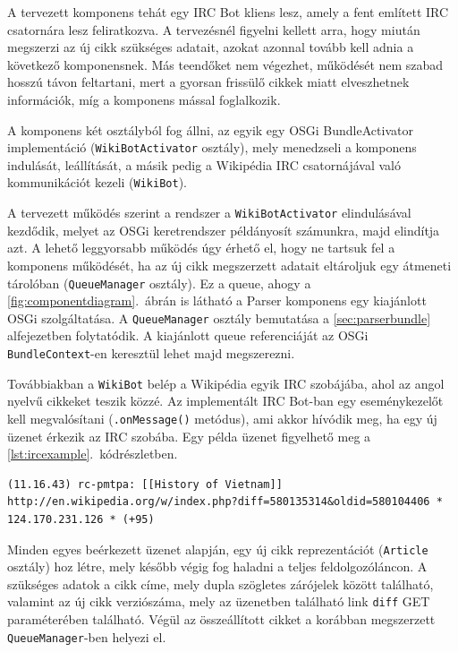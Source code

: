 A tervezett komponens tehát egy IRC Bot kliens lesz, amely a fent említett IRC csatornára lesz feliratkozva. A tervezésnél figyelni kellett arra, hogy miután megszerzi az új cikk szükséges adatait, azokat azonnal tovább kell adnia a következő komponensnek. Más teendőket nem végezhet, működését nem szabad hosszú távon feltartani, mert a gyorsan frissülő cikkek miatt elveszhetnek információk, míg a komponens mással foglalkozik.

A komponens két osztályból fog állni, az egyik egy OSGi BundleActivator implementáció (\texttt{WikiBotActivator} osztály), mely menedzseli a komponens indulását, leállítását, a másik pedig a Wikipédia IRC csatornájával való kommunikációt kezeli (\texttt{WikiBot}).

A tervezett működés szerint a rendszer a \texttt{WikiBotActivator} elindulásával kezdődik, melyet az OSGi keretrendszer példányosít számunkra, majd elindítja azt. A lehető leggyorsabb működés úgy érhető el, hogy ne tartsuk fel a komponens működését, ha az új cikk megszerzett adatait eltároljuk egy átmeneti tárolóban (\texttt{QueueManager} osztály). Ez a queue, ahogy a \ref{fig:componentdiagram}.~ábrán is látható a Parser komponens egy kiajánlott OSGi szolgáltatása. A \texttt{QueueManager} osztály bemutatása a \ref{sec:parserbundle} alfejezetben folytatódik. A kiajánlott queue referenciáját az OSGi \texttt{BundleContext}-en keresztül lehet majd megszerezni.

Továbbiakban a \texttt{WikiBot} belép a Wikipédia egyik IRC szobájába, ahol az angol nyelvű cikkeket teszik közzé. Az implementált IRC Bot-ban egy eseménykezelőt kell megvalósítani (\texttt{.onMessage()} metódus), ami akkor hívódik meg, ha egy új üzenet érkezik az IRC szobába. Egy példa üzenet figyelhető meg a \ref{lst:ircexample}.~kódrészletben.

\begin{lstlisting}[label={lst:ircexample}, caption=Példa üzenet az angol nyelvű Wikipédia IRC csatornájából,breaklines=true]
(11.16.43) rc-pmtpa: [[History of Vietnam]]  http://en.wikipedia.org/w/index.php?diff=580135314&oldid=580104406 * 124.170.231.126 * (+95) 
\end{lstlisting}

Minden egyes beérkezett üzenet alapján, egy új cikk reprezentációt (\texttt{Article} osztály) hoz létre, mely később végig fog haladni a teljes feldolgozóláncon. A szükséges adatok a cikk címe, mely dupla szögletes zárójelek között található, valamint az új cikk verziószáma, mely az üzenetben található link \texttt{diff} GET paraméterében található. Végül az összeállított cikket a korábban megszerzett \texttt{QueueManager}-ben helyezi el.

